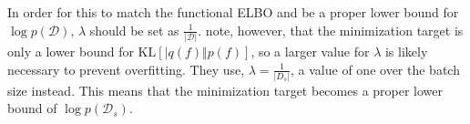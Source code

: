 \documentclass[]{uai2021} %
\newcommand{\defeq}{\vcentcolon=}
\newcommand{\E}{\mathbb{E}}
\newcommand{\D}{\mathcal{D}}
\newcommand{\B}{\mathcal{B}}
\newcommand{\KL}{\mathrm{KL}}
\begin{document}
In order for this to match the functional ELBO and be a proper lower bound
for \(\log p(\D)\), \(\lambda\) should be set as \(\frac{1}{\lvert \D \rvert}\).
\cite{sun_functional_2019} note, however, that the minimization target is only a lower
bound for \(\KL \left[ \lvert q(f) \Vert p(f) \right]\), so a larger
value for \(\lambda\) is likely necessary to prevent overfitting. They use,
\(\lambda = \frac{1}{\lvert D_s \rvert}\), a value of one over the batch size instead.
This means that the minimization target becomes a proper lower bound of \(\log p(\D_s)\).




\end{document}
